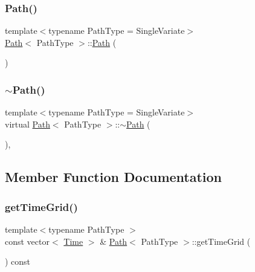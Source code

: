 \subsubsection{\texorpdfstring{Path()}{Path()}\hspace{0.1cm}{\footnotesize\ttfamily [2/2]}}
{\footnotesize\ttfamily template$<$typename Path\+Type = Single\+Variate$>$ \\
\hyperlink{class_path}{Path}$<$ Path\+Type $>$\+::\hyperlink{class_path}{Path} (\begin{DoxyParamCaption}{ }\end{DoxyParamCaption})\hspace{0.3cm}{\ttfamily [default]}}

\hypertarget{class_path_a83933167b70441af12427b23d88b0447}{}\label{class_path_a83933167b70441af12427b23d88b0447} 
\subsubsection{\texorpdfstring{$\sim$\+Path()}{~Path()}}
{\footnotesize\ttfamily template$<$typename Path\+Type = Single\+Variate$>$ \\
virtual \hyperlink{class_path}{Path}$<$ Path\+Type $>$\+::$\sim$\hyperlink{class_path}{Path} (\begin{DoxyParamCaption}{ }\end{DoxyParamCaption})\hspace{0.3cm}{\ttfamily [inline]}, {\ttfamily [virtual]}}



\subsection{Member Function Documentation}
\hypertarget{class_path_a511b7a93c62893bcafba4749ad1dd1b3}{}\label{class_path_a511b7a93c62893bcafba4749ad1dd1b3} 
\subsubsection{\texorpdfstring{get\+Time\+Grid()}{getTimeGrid()}}
{\footnotesize\ttfamily template$<$typename Path\+Type $>$ \\
const vector$<$ \hyperlink{_name_def_8h_ac2d3e0ba793497bcca555c7c2cf64ff3}{Time} $>$ \& \hyperlink{class_path}{Path}$<$ Path\+Type $>$\+::get\+Time\+Grid (\begin{DoxyParamCaption}{ }\end{DoxyParamCaption}) const\hspace{0.3cm}{\ttfamily [virtual]}}



